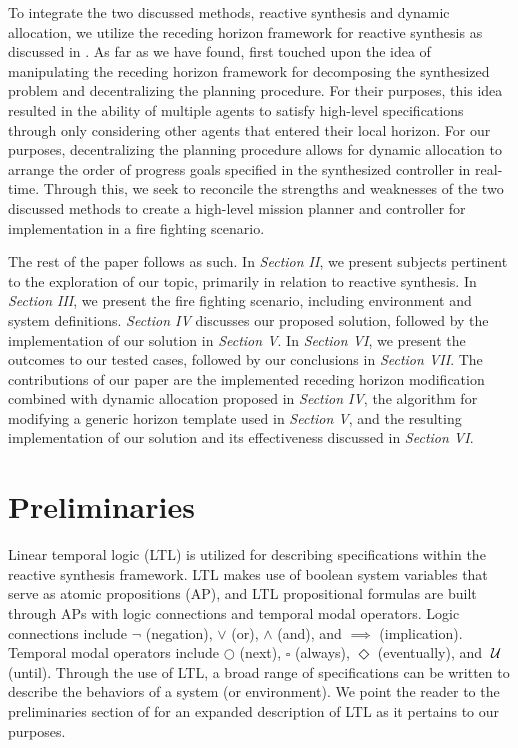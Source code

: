 \documentclass{ieeeaccess}
\newcommand{\always}{\square}
\newcommand{\eventually}{\Diamond}
\newcommand{\next}{\bigcirc}
\newcommand{\until}{\hspace{1mm}\mathcal{U}\hspace{1mm}}
\begin{document}
To integrate the two discussed methods, reactive synthesis and dynamic allocation, we utilize the receding horizon framework for reactive synthesis as discussed in \cite{c10}. As far as we have found, \cite{c6} first touched upon the idea of manipulating the receding horizon framework for decomposing the synthesized problem and decentralizing the planning procedure. For their purposes, this idea resulted in the ability of multiple agents to satisfy high-level specifications through only considering other agents that entered their local horizon. For our purposes, decentralizing the planning procedure allows for dynamic allocation to arrange the order of progress goals specified in the synthesized controller in real-time. Through this, we seek to reconcile the strengths and weaknesses of the two discussed methods to create a high-level mission planner and controller for implementation in a fire fighting scenario. 


The rest of the paper follows as such. In \textit{Section II}, we present subjects pertinent to the exploration of our topic, primarily in relation to reactive synthesis. In \textit{Section III}, we present the fire fighting scenario, including environment and system definitions. \textit{Section IV} discusses our proposed solution, followed by the implementation of our solution in \textit{Section V}. In \textit{Section VI}, we present the outcomes to our tested cases, followed by our conclusions in \textit{Section VII}. The contributions of our paper are the implemented receding horizon modification combined with dynamic allocation proposed in \textit{Section IV}, the algorithm for modifying a generic horizon template used in \textit{Section V}, and the resulting implementation of our solution and its effectiveness discussed in \textit{Section VI}.

\section{Preliminaries}

Linear temporal logic (LTL) is utilized for describing specifications within the reactive synthesis framework. LTL makes use of boolean system variables that serve as atomic propositions (AP), and LTL propositional formulas are built through APs with logic connections and temporal modal operators. Logic connections include $\lnot$ (negation), $\lor$ (or), $\land$ (and),  and $\implies$ (implication). Temporal modal operators include $\next$ (next), $\always$ (always), $\eventually$ (eventually), and $\until$ (until). Through the use of LTL, a broad range of specifications can be written to describe the behaviors of a system (or environment). We point the reader to the preliminaries section of \cite{c7} for an expanded description of LTL as it pertains to our purposes.
\end{document}
